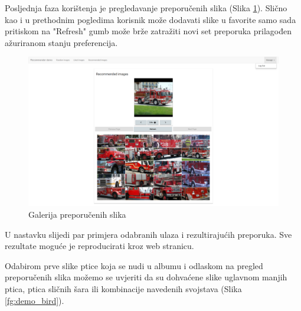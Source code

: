 \documentclass[times, utf8, proizvoljni, numeric]{fer}
\begin{document}
Posljednja faza korištenja je pregledavanje preporučenih slika (Slika \ref{fg:demo_recommended}). Slično kao i u prethodnim pogledima korisnik može dodavati slike u favorite samo sada pritiskom na "Refresh" gumb može brže zatražiti novi set preporuka prilagođen ažuriranom stanju preferencija. 

\begin{figure}[H]
	\begin{center}
		\captionsetup{justification=centering}
		\includegraphics[width=1.0\textwidth]{./imgs/demo-preporucitelja-po-sadrzaju/tijek-rada/demo-reco.png}
		\caption{Galerija preporučenih slika}
		\label{fg:demo_recommended}
	\end{center}
\end{figure}


U nastavku slijedi par primjera odabranih ulaza i rezultirajućih preporuka. Sve rezultate moguće je reproducirati kroz web stranicu. 

Odabirom prve slike ptice koja se nudi u albumu i odlaskom na pregled preporučenih slika možemo se uvjeriti da su dohvaćene slike uglavnom manjih ptica, ptica sličnih šara ili kombinacije navedenih svojstava (Slika \ref{fg:demo_bird}). 
\end{document}
